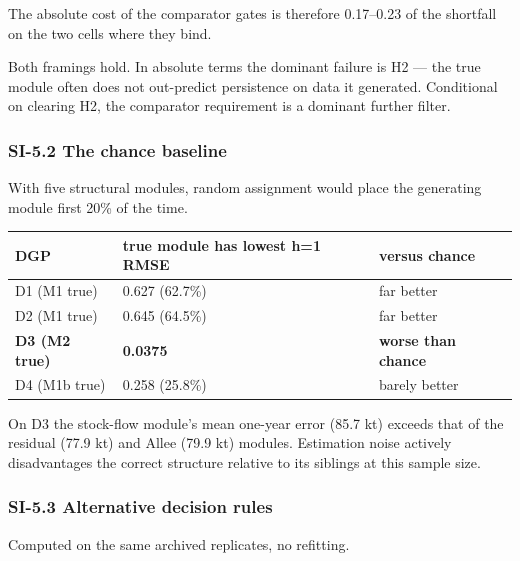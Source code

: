\documentclass[11pt]{article}
\begin{document}
The absolute cost of the comparator gates is therefore 0.17--0.23 of the
shortfall on the two cells where they bind.

Both framings hold. In absolute terms the dominant failure is H2 --- the
true module often does not out-predict persistence on data it generated.
Conditional on clearing H2, the comparator requirement is a dominant
further filter.

\subsubsection{SI-5.2 The chance
baseline}\label{si-5.2-the-chance-baseline}

With five structural modules, random assignment would place the
generating module first 20\% of the time.

{\def\LTcaptype{none} %
\begin{longtable}[]{@{}lll@{}}
\toprule\noalign{}
DGP & true module has lowest h=1 RMSE & versus chance \\
\midrule\noalign{}
\endhead
\bottomrule\noalign{}
\endlastfoot
D1 (M1 true) & 0.627 (62.7\%) & far better \\
D2 (M1 true) & 0.645 (64.5\%) & far better \\
\textbf{D3 (M2 true)} & \textbf{0.0375} & \textbf{worse than chance} \\
D4 (M1b true) & 0.258 (25.8\%) & barely better \\
\end{longtable}
}

On D3 the stock-flow module's mean one-year error (85.7 kt) exceeds that
of the residual (77.9 kt) and Allee (79.9 kt) modules. Estimation noise
actively disadvantages the correct structure relative to its siblings at
this sample size.

\subsubsection{SI-5.3 Alternative decision
rules}\label{si-5.3-alternative-decision-rules}

Computed on the same archived replicates, no refitting.
\end{document}
